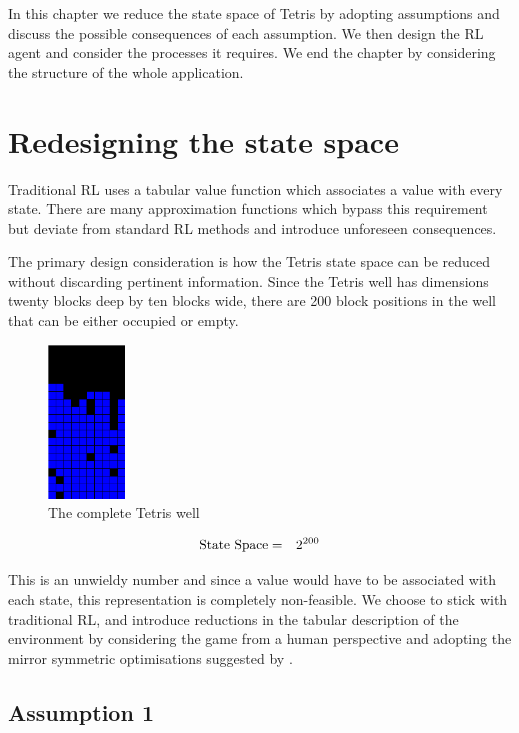 \documentclass{rucsthesis}
\begin{document}
In this chapter we reduce the state space of Tetris by adopting assumptions and discuss the possible consequences of each assumption. We then design the RL agent and consider the processes it requires. We end the chapter by considering the structure of the whole application.

\section{Redesigning the state space}

Traditional RL uses a tabular value function which associates a value with every state. There are many approximation functions which bypass this requirement but deviate from standard RL methods and introduce unforeseen consequences.

The primary design consideration is how the Tetris state space can be reduced without discarding pertinent information. Since the Tetris well has dimensions twenty blocks deep by ten blocks wide, there are 200 block positions in the well that can be either occupied or empty.

\begin{figure}[h]
\centering
\includegraphics[width=0.8in]{fullwell.png}
\caption{The complete Tetris well}
\label{fig:fullwell}
\end{figure}

\begin{eqnarray}
\centering
\textrm{State Space} & = & 2^{200} 
\end{eqnarray}

This is an unwieldy number and since a value would have to be associated with each state, this representation is completely non-feasible. We choose to stick with traditional RL, and introduce reductions in the tabular description of the environment by considering the game from a human perspective and adopting the mirror symmetric optimisations suggested by \cite{yaeltetris}. 

\subsection*{Assumption 1}
\end{document}
